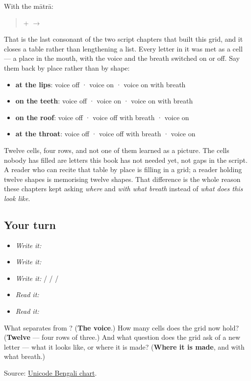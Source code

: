 With the mātrā:

\begin{quote}
\textbf{} + \textbf{} $\to$ \textbf{}
\end{quote}

That is the last consonant of the two script chapters that built this grid, and it closes a table rather than lengthening a list. Every letter in it was met as a cell — a place in the mouth, with the voice and the breath switched on or off. Say them back by place rather than by shape:

\begin{itemize}
\raggedright
  \item \textbf{at the lips}: \textbf{} voice off · \textbf{} voice on · \textbf{} voice on with breath
  \item \textbf{on the teeth}: \textbf{} voice off · \textbf{} voice on · \textbf{} voice on with breath
  \item \textbf{on the roof}: \textbf{} voice off · \textbf{} voice off with breath · \textbf{} voice on
  \item \textbf{at the throat}: \textbf{} voice off · \textbf{} voice off with breath · \textbf{} voice on
\end{itemize}

Twelve cells, four rows, and not one of them learned as a picture. The cells nobody has filled are letters this book has not needed yet, not gaps in the script. A reader who can recite that table by place is filling in a grid; a reader holding twelve shapes is memorising twelve shapes. That difference is the whole reason these chapters kept asking \emph{where} and \emph{with what breath} instead of \emph{what does this look like}.

\subsection*{Your turn}
\begin{itemize}
\raggedright
  \item \emph{Write it:} 
  \item \emph{Write it:}   
  \item \emph{Write it:}    /    /    /   
  \item \emph{Read it:} 
  \item \emph{Read it:}  
\end{itemize}

\begin{tcolorbox}[breakable,colback=teal!4,colframe=teal!35!black,title={Before you move on}]
What separates \textbf{} from \textbf{}? (\textbf{The voice}.) How many cells does the grid now hold? (\textbf{Twelve} — four rows of three.) And what question does the grid ask of a new letter — what it looks like, or where it is made? (\textbf{Where it is made}, and with what breath.)

Source: \href{https://www.unicode.org/charts/PDF/U0980.pdf}{Unicode Bengali chart}.
\end{tcolorbox}
